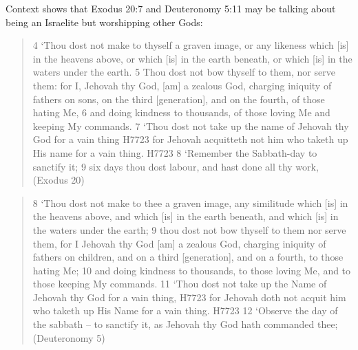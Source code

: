 \documentclass[11pt]{article}
\begin{document}
Context shows that Exodus 20:7 and Deuteronomy 5:11 may be talking about being an Israelite but worshipping other Gods:

\begin{quote}
4 `Thou dost not make to thyself a graven image, or any likeness which [is] in the heavens above, or which [is] in the earth beneath, or which [is] in the waters under the earth.
5 Thou dost not bow thyself to them, nor serve them: for I, Jehovah thy God, [am] a zealous God, charging iniquity of fathers on sons, on the third [generation], and on the fourth, of those hating Me,
6 and doing kindness to thousands, of those loving Me and keeping My commands.
7 `Thou dost not take up the name of Jehovah thy God for a vain thing H7723 for Jehovah acquitteth not him who taketh up His name for a vain thing. H7723 8 `Remember the Sabbath-day to sanctify it; 9 six days thou dost labour, and hast done all thy work,
(Exodus 20)
\end{quote}
\begin{quote}
8 `Thou dost not make to thee a graven image, any similitude which [is] in the heavens above, and which [is] in the earth beneath, and which [is] in the waters under the earth;
9 thou dost not bow thyself to them nor serve them, for I Jehovah thy God [am] a zealous God, charging iniquity of fathers on children, and on a third [generation], and on a fourth, to those hating Me;
10 and doing kindness to thousands, to those loving Me, and to those keeping My commands.
11 `Thou dost not take up the Name of Jehovah thy God for a vain thing,  H7723 for Jehovah doth not acquit him who taketh up His Name for a vain thing. H7723
12 `Observe the day of the sabbath -- to sanctify it, as Jehovah thy God hath commanded thee;
(Deuteronomy 5)
\end{quote}
\end{document}
